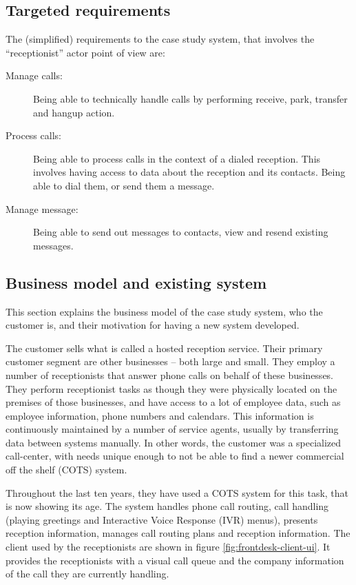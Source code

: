 \subsection{Targeted requirements}
The (simplified) requirements to the case study system, that involves the ``receptionist'' actor point of view are:
\begin{description}
  \item[Manage calls:] Being able to technically handle calls by performing receive, park, transfer and hangup action.
  \item[Process calls:] Being able to process calls in the context of a dialed reception. This involves having access to data about the reception and its contacts. Being able to dial them, or send them a message.
  \item[Manage message:] Being able to send out messages to contacts, view and resend existing messages.
\end{description}

\subsection{Business model and existing system}
This section explains the business model of the case study system, who the customer is, and their motivation for having a new system developed.\medskip

\noindent The customer sells what is called a hosted reception service. Their primary customer segment are other businesses -- both large and small. They employ a number of receptionists that answer phone calls on behalf of these businesses. They perform receptionist tasks as though they were physically located on the premises of those businesses, and have access to a lot of employee data, such as employee information, phone numbers and calendars. This information is continuously maintained by a number of service agents, usually by transferring data between systems manually. In other words, the customer was a specialized call-center, with needs unique enough to not be able to find a newer commercial off the shelf (COTS) system.\medskip

\noindent Throughout the last ten years, they have used a COTS system for this task, that is now showing its age. The system handles phone call routing, call handling (playing greetings and Interactive Voice Response (IVR) menus), presents reception information, manages call routing plans and reception information. The client used by the receptionists are shown in figure \ref{fig:frontdesk-client-ui}. It provides the receptionists with a visual call queue and the company information of the call they are currently handling.\medskip

